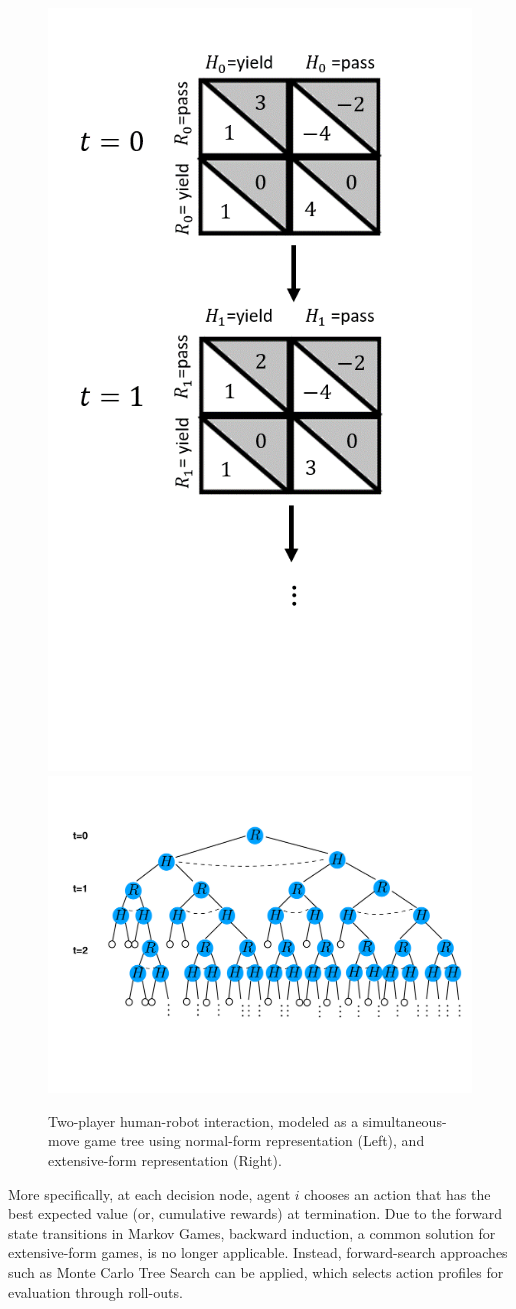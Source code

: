 \documentclass[letterpaper, 10 pt, conference]{ieeeconf}  %
\begin{document}
\begin{figure}[t]
	\centering
	\hspace{-1.7em}
	\includegraphics[width=0.3\columnwidth]{newGameTree}
	\vspace{-.75em}
	\hspace{-2em}
  \includegraphics[width=0.8\columnwidth]{game_tree}
	\vspace{-2.4em}
	\hspace{-1em}
	\caption{Two-player human-robot interaction, modeled as a simultaneous-move 
  game tree using normal-form representation (Left), and extensive-form 
  representation (Right). }
	\vspace{-1.4em}
	\label{fig:game_tree}
\end{figure}



More specifically, at each decision node, agent $i$ chooses an action that has 
the best expected value (or, cumulative rewards) at termination. 
Due to the forward state transitions in Markov Games, backward induction, a common solution for extensive-form games, is no longer applicable. 
Instead, forward-search approaches such as Monte Carlo Tree Search can be 
applied, which selects action profiles for evaluation through roll-outs.
\end{document}
